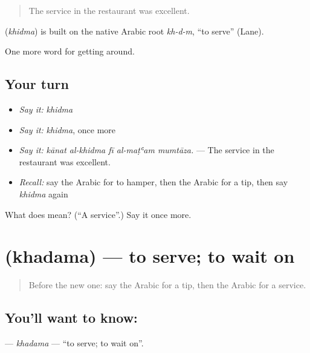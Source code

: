 \begin{quote}
The service in the restaurant was excellent.
\end{quote}

\begin{cousinweb}
\textbf{} (\emph{khidma}) is built on the native Arabic root \emph{kh-d-m}, \textquotedblleft{}to serve\textquotedblright{} (Lane).
\end{cousinweb}

\begin{grammarlens}[title={What you've built}]
One more word for getting around.
\end{grammarlens}

\subsection*{Your turn}
\begin{itemize}
\raggedright
  \item \emph{Say it:} \emph{khidma}
  \item \emph{Say it:} \emph{khidma}, once more
  \item \emph{Say it:} \emph{kānat al-khidma fī al-maṭʿam mumtāza.} — The service in the restaurant was excellent.
  \item \emph{Recall:} say the Arabic for to hamper, then the Arabic for a tip, then say \emph{khidma} again
\end{itemize}

\begin{tcolorbox}[breakable,colback=teal!4,colframe=teal!35!black,title={Before you move on}]
What does  mean? (\textquotedblleft{}A service\textquotedblright{}.) Say it once more.
\end{tcolorbox}
\section[\texorpdfstring{\ar{خدم} (khadama)}{خدم (khadama)}]{ (khadama) — to serve; to wait on}

\label{lesson:AR-C446-khadama}



\begin{quote}
Before the new one: say the Arabic for a tip, then the Arabic for a service.
\end{quote}

\subsection*{You'll want to know: }
\textbf{} — \emph{khadama} — \textquotedblleft{}to serve; to wait on\textquotedblright{}.

